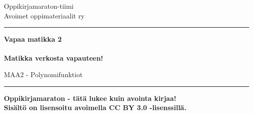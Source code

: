 
\begin{center}
    \begin{doublespace}
        \begin{LARGE}
            \textrm{Oppikirjamaraton-tiimi \\ Avoimet oppimateriaalit ry} \\
        \end{LARGE}
      
        \vspace{0.5cm}
        \hrule height 2pt
        \vspace{1cm}
        \begin{Huge}
            \textbf{\textrm{Vapaa matikka 2}\\\ \\Matikka verkosta vapauteen!}
        \end{Huge}
      
      
        \vfill
      
        \begin{huge}
            \textrm{MAA2 - Polynomifunktiot}
        \end{huge}
        \vspace{1cm}
        \hrule height 2pt
    \end{doublespace}
\end{center}

\vfill

\begin{flushright}
    \textbf{
        Oppikirjamaraton - tätä lukee kuin avointa kirjaa! \\
        Sisältö on lisensoitu avoimella CC BY 3.0 -lisenssillä. \\
    }
\end{flushright}
